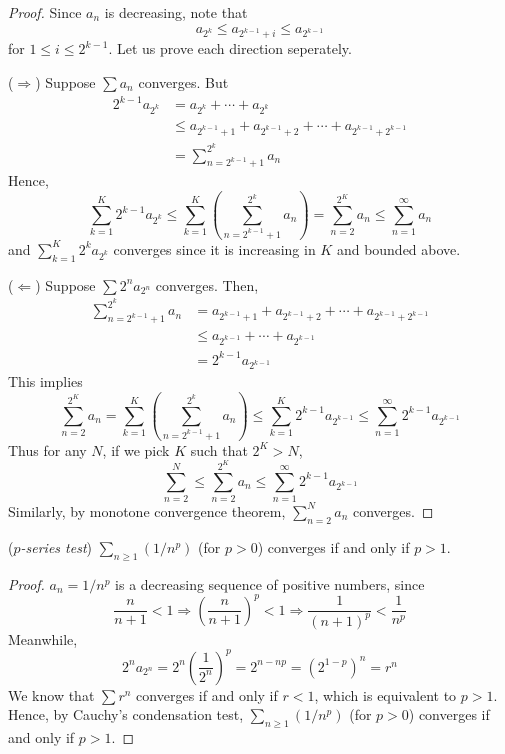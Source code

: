\documentclass[10pt, a4paper, twoside]{report}
\begin{document}
\begin{proof}
    Since \(a_n\) is decreasing, note that
    \[a_{2^k}\leq a_{2^{k-1}+i}\leq a_{2^{k-1}}\]
    for \(1\leq i\leq 2^{k-1}\). Let us prove each direction seperately.

    (\(\Rightarrow\)) Suppose \(\sum a_n\) converges. But
    \begin{align*}
        2^{k-1}a_{2^k}&=a_{2^k}+\cdots+a_{2^k} \\
        &\leq a_{2^{k-1}+1}+a_{2^{k-1}+2}+\cdots+a_{2^{k-1}+2^{k-1}} \\
        &=\sum_{n=2^{k-1}+1}^{2^k}a_n
    \end{align*}
    Hence,
    \[\sum_{k=1}^{K}2^{k-1}a_{2^k}\leq\sum_{k=1}^{K}\left(\sum_{n=2^{k-1}+1}^{2^k}a_n\right)=\sum_{n=2}^{2^K}a_n\leq\sum_{n=1}^{\infty}a_n\]
    and \(\sum_{k=1}^{K}2^ka_{2^k}\) converges since it is increasing in \(K\) and bounded above.

    (\(\Leftarrow\)) Suppose \(\sum 2^na_{2^n}\) converges. Then,
    \begin{align*}
        \sum_{n=2^{k-1}+1}^{2^k}a_n&= a_{2^{k-1}+1}+a_{2^{k-1}+2}+\cdots+a_{2^{k-1}+2^{k-1}} \\
        &\leq
        a_{2^{k-1}}+\cdots+a_{2^{k-1}} \\
        &=2^{k-1}a_{2^{k-1}}
    \end{align*}
    This implies
    \[\sum_{n=2}^{2^K}a_n=\sum_{k=1}^{K}\left(\sum_{n=2^{k-1}+1}^{2^k}a_n\right)\leq\sum_{k=1}^{K}2^{k-1}a_{2^{k-1}}\leq\sum_{n=1}^{\infty}2^{k-1}a_{2^{k-1}}\]
    Thus for any \(N\), if we pick \(K\) such that \(2^K>N\),
    \[\sum_{n=2}^{N}\leq\sum_{n=2}^{2^K}a_n\leq\sum_{n=1}^{\infty}2^{k-1}a_{2^{k-1}}\]
    Similarly, by monotone convergence theorem, \(\sum_{n=2}^Na_n\) converges.
\end{proof}
\begin{corollary}
    (\emph{\(p\)-series test}) \(\sum_{n\geq 1}(1/n^p)\) (for \(p>0\)) converges if and only if \(p>1\).
\end{corollary}
\begin{proof}
    \(a_n=1/n^p\) is a decreasing sequence of positive numbers, since
    \[\frac{n}{n+1}<1\Rightarrow\left(\frac{n}{n+1}\right)^p<1\Rightarrow\frac{1}{(n+1)^p}<\frac{1}{n^p}\]
    Meanwhile,
    \[2^na_{2^n}=2^n\left(\frac{1}{2^n}\right)^p=2^{n-np}=\left(2^{1-p}\right)^n=r^n\]
    We know that \(\sum r^n\) converges if and only if \(r<1\), which is equivalent to \(p>1\). Hence, by Cauchy's condensation test, \(\sum_{n\geq 1}(1/n^p)\) (for \(p>0\)) converges if and only if \(p>1\).
\end{proof}
\end{document}
